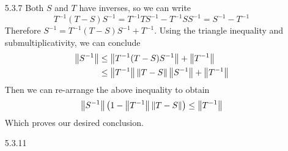 \documentclass[../../Solutions.tex]{subfiles}
\begin{document}
\begin{itemize}
	\item [5.3.7] Both $S$ and $T$ have inverses, so we can write
		$$ T^{-1}(T-S)S^{-1} = T^{-1}TS^{-1} - T^{-1}SS^{-1} = S^{-1} - T^{-1} $$
		Therefore $S^{-1} = T^{-1}(T-S)S^{-1} + T^{-1}$.
		Using the triangle inequality and submultiplicativity, we can conclude
		\begin{align*}
			\left\lVert S^{-1}\right\rVert &\leq \left\lVert T^{-1}(T-S)S^{-1}\right\rVert + \left\lVert T^{-1}\right\rVert \\
				&\leq \left\lVert T^{-1}\right\rVert\left\lVert T-S\right\rVert\left\lVert S^{-1}\right\rVert + \left\lVert T^{-1}\right\rVert
		\end{align*}
		Then we can re-arrange the above inequality to obtain
		\begin{equation*}
			\left\lVert S^{-1}\right\rVert\left(1-\left\lVert T^{-1}\right\rVert\left\lVert T-S\right\rVert\right) \leq \left\lVert T^{-1}\right\rVert
		\end{equation*}
		Which proves our desired conclusion.
	
	\item [5.3.11]
	
\end{itemize}
\end{document}
